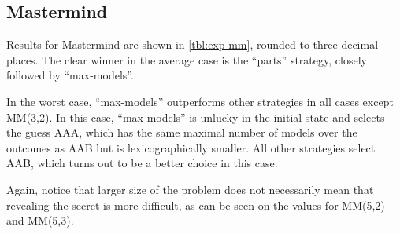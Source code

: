 \subsection{Mastermind}

Results for Mastermind are shown in \autoref{tbl:exp-mm},
  rounded to three decimal places.
The clear winner in the average case is the ``parts'' strategy,
  closely followed by ``max-models''.

In the worst case, ``max-models'' outperforms other
  strategies in all cases except MM(3,2).
In this case, ``max-models'' is unlucky in the initial state
  and selects the guess AAA,
  which has the same maximal number of models over the outcomes as AAB
  but is lexicographically smaller.
All other strategies select AAB,
  which turns out to be a better choice in this case.

Again, notice that larger size of the problem does not necessarily mean that
  revealing the secret is more difficult,
  as can be seen on the values for MM(5,2) and MM(5,3).

